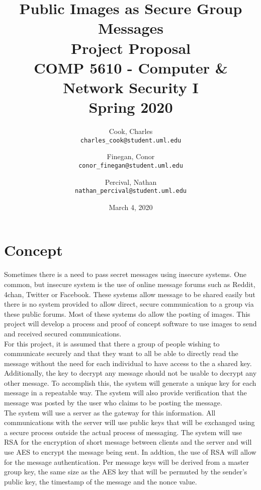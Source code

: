\documentclass[11pt]{article}
\begin{document}
\title{\textbf{Public Images as Secure Group Messages}\\
       Project Proposal\\
       COMP 5610 - Computer \& Network Security I\\
       Spring 2020
       }
\author{
        Cook, Charles\\
        \texttt{charles\_cook@student.uml.edu}
        \and
        Finegan, Conor\\
        \texttt{conor\_finegan@student.uml.edu}
        \and
        Percival, Nathan\\
        \texttt{nathan\_percival@student.uml.edu}
        }
\date{March 4, 2020}
\maketitle
\section{Concept}
Sometimes there is a need to pass secret messages using insecure systems.   One common, but insecure system is the use of online message forums such as Reddit, 4chan, Twitter or Facebook.   These systems allow message to be shared easily but there is no system provided to allow direct, secure communication to a group via these public forums.   Most of these systems do allow the posting of images. This project will develop a process and proof of concept software to use images to send and received secured communications. \\
For this project, it is assumed that there a group of people wishing to communicate securely and that they want to all be able to directly read the message without the need for each individual to have access to the a shared key.   Additionally, the key to decrypt any message should not be usable to decrypt any other message.  To accomplish this, the system will generate a unique key for each message in a repeatable way.   The system will also provide verification that the message was posted by the user who claims to be posting the message.\\ 
The system will use a server as the gateway for this information.  All communications with the server will use public keys that will be exchanged using a secure process outside the actual process of messaging.  The system will use RSA for the encryption of short message between clients and the server and will use AES to encrypt the message being sent.   In addtion, the use of RSA will allow for the message authentication.   Per message keys will be derived from a master group key, the same size as the AES key that will be permuted by the sender's public key, the timestamp of the message and the nonce value.
\end{document}
